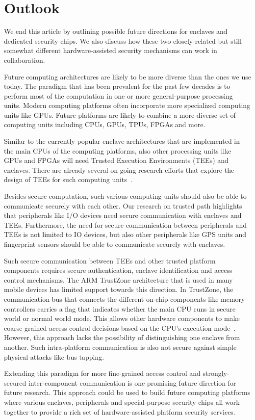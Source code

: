 
\section*{Outlook}

We end this article by outlining possible future directions for enclaves and dedicated security chips. We also discuss how these two closely-related but still somewhat different hardware-assisted security mechanisms can work in collaboration.

Future computing architectures are likely to be more diverse than the ones we use today. The paradigm that has been prevalent for the past few decades is to perform most of the computation in one or more general-purpose processing units. Modern computing platforms often incorporate more specialized computing units like GPUs. Future platforms are likely to combine a more diverse set of computing units including CPUs, GPUs, TPUs, FPGAs and more. %

Similar to the currently popular enclave architectures that are implemented in the main CPUs of the computing platforms, also other processing units like GPUs and FPGAs will need Trusted Execution Environments (TEEs) and enclaves. There are already several on-going research efforts that explore the design of TEEs for such computing units~\cite{volos2018graviton}.

Besides secure computation, such various computing units should also be able to communicate securely with each other. Our research on trusted path highlights that peripherals like I/O devices need secure communication with enclaves and TEEs. Furthermore, the need for secure communication between peripherals and TEEs is not limited to IO devices, but also other peripherals like GPS units and fingerprint sensors should be able to communicate securely with enclaves. 

Such secure communication between TEEs and other trusted platform components requires secure authentication, enclave identification and access control mechanisms. The ARM TrustZone architecture that is used in many mobile devices has limited support towards this direction. In TrustZone, the communication bus that connects the different on-chip components like memory controllers carries a flag that indicates whether the main CPU runs in secure world or normal world mode. This allows other hardware components to make coarse-grained access control decisions based on the CPU's execution mode~\cite{ekberg2014untapped}. However, this approach lacks the possibility of distinguishing one enclave from another. Such intra-platform communication is also not secure against simple physical attacks like bus tapping. 

Extending this paradigm for more fine-grained access control and strongly-secured inter-component communication is one promising future direction for future research. This approach could be used to build future computing platforms where various enclaves, peripherals and special-purpose security chips all work together to provide a rich set of hardware-assisted platform security services.
